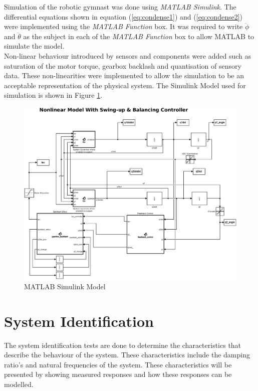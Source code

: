 Simulation of the robotic gymnast was done using \textit{MATLAB Simulink}. The differential equations shown in equation (\ref{eq:condense1}) and (\ref{eq:condense2}) were implemented using the \textit{MATLAB Function} box. It was required to write $\ddot{\phi}$ and $\ddot{\theta}$ as the subject in each of the \textit{MATLAB Function} box to allow MATLAB to simulate the model.\\

Non-linear behaviour introduced by sensors and components were added such as saturation of the motor torque, gearbox backlash and quantisation of sensory data. These non-linearities were implemented to allow the simulation to be an acceptable representation of the physical system. The Simulink Model used for simulation is shown in Figure \ref{fig:sim_nonlinearfeedback}.

\begin{figure}[h]
	\centering
	\includegraphics[scale=0.3]{./figs/simulink/latex_simulink.eps}
	\caption{MATLAB Simulink Model}
	\label{fig:sim_nonlinearfeedback}
\end{figure}

\section{System Identification}

The system identification tests are done to determine the characteristics that describe the behaviour of the system. These characteristics include the damping ratio's and natural frequencies of the system. These characteristics will be presented by showing measured responses and how these responses can be modelled. \\


